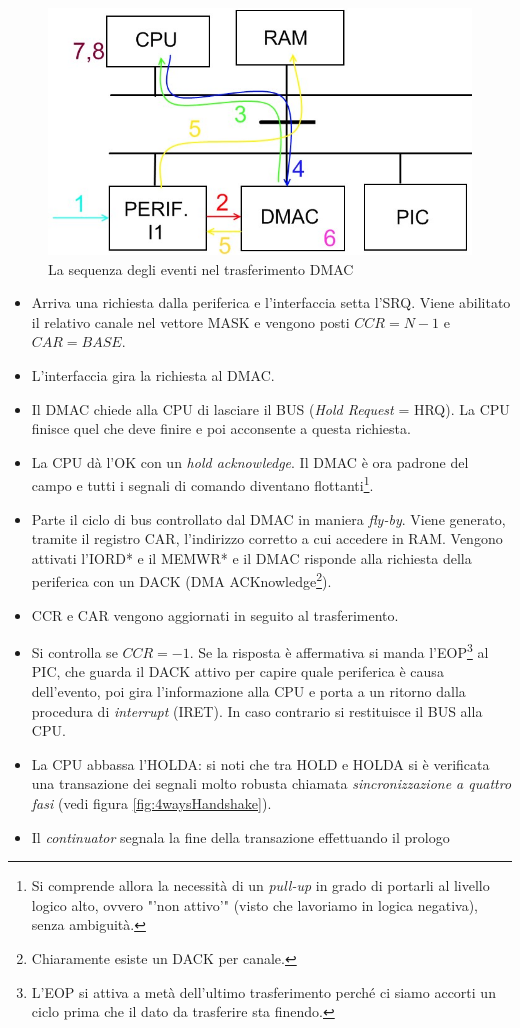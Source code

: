 \begin{figure}[!h]
\centering
\includegraphics[width=0.75\columnwidth]{img/sequenzaEventi}
\caption{La sequenza degli eventi nel trasferimento DMAC}
\label{fig:sequenzaEventi}
\end{figure}

\begin{itemize}
\item Arriva una richiesta dalla periferica e l'interfaccia setta l'SRQ. Viene abilitato il relativo canale nel vettore MASK e vengono posti $CCR=N-1$ e $CAR=BASE$.
\item L'interfaccia gira la richiesta al DMAC.
\item Il DMAC chiede alla CPU di lasciare il BUS (\textit{Hold Request} = HRQ). La CPU finisce quel che deve finire e poi acconsente a questa richiesta.
\item La CPU dà l'OK con un \textit{hold acknowledge}. Il DMAC è ora padrone del campo e tutti i segnali di comando diventano flottanti\footnote{Si comprende allora la necessità di un \textit{pull-up} in grado di portarli al livello logico alto, ovvero "'non attivo'" (visto che lavoriamo in logica negativa), senza ambiguità.}.
\item Parte il ciclo di bus controllato dal DMAC in maniera \textit{fly-by}. Viene generato, tramite il registro CAR, l'indirizzo corretto a cui accedere in RAM. Vengono attivati l'IORD* e il MEMWR* e il DMAC risponde alla richiesta della periferica con un DACK (DMA ACKnowledge\footnote{Chiaramente esiste un DACK per canale.}).
\item CCR e CAR vengono aggiornati in seguito al trasferimento.
\item Si controlla se $CCR=-1$. Se la risposta è affermativa si manda l'EOP\footnote{L'EOP si attiva a metà dell'ultimo trasferimento perché ci siamo accorti un ciclo prima che il dato da trasferire sta finendo.} al PIC, che guarda il DACK attivo per capire quale periferica è causa dell'evento, poi gira l'informazione alla CPU e porta a un ritorno dalla procedura di \textit{interrupt} (IRET). In caso contrario si restituisce il BUS alla CPU.
\item La CPU abbassa l'HOLDA: si noti che tra HOLD e HOLDA si è verificata una transazione dei segnali molto robusta chiamata \textit{sincronizzazione a quattro fasi} (vedi figura \ref{fig:4waysHandshake}).
\item Il \textit{continuator} segnala la fine della transazione effettuando il prologo
\end{itemize}

